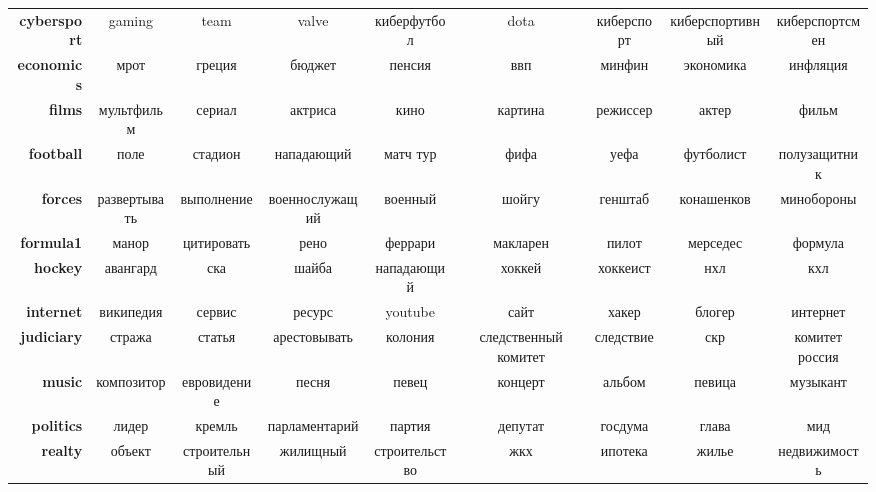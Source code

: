 \documentclass[a4paper, 14pt]{extarticle}
\begin{document}
\begin{table}[h]
{\begin{tabular}{r|cccccccc}
			\textbf{cybersport}      &             gaming &            team &              valve &           киберфутбол &                  dota &     киберспорт &  киберспортивный &  киберспортсмен \\
			\textbf{economics}       &               мрот &          греция &             бюджет &                пенсия &                   ввп &         минфин &        экономика &        инфляция \\
			\textbf{films}           &         мультфильм &          сериал &            актриса &                  кино &               картина &       режиссер &            актер &           фильм \\
			\textbf{football}        &               поле &         стадион &         нападающий &              матч тур &                  фифа &           уефа &        футболист &    полузащитник \\
			\textbf{forces}          &       развертывать &      выполнение &     военнослужащий &               военный &                 шойгу &        генштаб &       конашенков &      минобороны \\
			\textbf{formula1}        &              манор &      цитировать &               рено &               феррари &              макларен &          пилот &         мерседес &         формула \\
			\textbf{hockey}          &           авангард &             ска &              шайба &            нападающий &                хоккей &       хоккеист &              нхл &             кхл \\
			\textbf{internet}        &          википедия &          сервис &             ресурс &               youtube &                  сайт &          хакер &           блогер &        интернет \\
			\textbf{judiciary}       &             стража &          статья &       арестовывать &               колония &  следственный комитет &      следствие &              скр &  комитет россия \\
			\textbf{music}           &         композитор &     евровидение &              песня &                 певец &               концерт &         альбом &           певица &        музыкант \\
			\textbf{politics}        &              лидер &          кремль &      парламентарий &                партия &               депутат &        госдума &            глава &             мид \\
			\textbf{realty}          &             объект &    строительный &           жилищный &         строительство &                   жкх &        ипотека &            жилье &    недвижимость \\

\end{tabular}}
\end{table}
\end{document}
